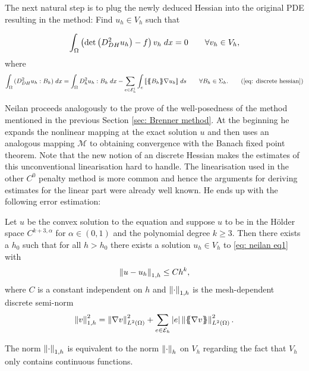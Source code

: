 The next natural step is to plug the newly deduced Hessian into the original \MA PDE resulting in the method: Find $u_h \in V_h$ such that

\begin{align}
		\int_{\Omega} {{ \left(\det{\left(D_{DH}^2 u_h\right)} - f \right) v_h}\;dx} = 0 \qquad \forall v_h \in V_h, \label{eq: neilan eq1}
\end{align}
where
	\begin{align}
		\myIntX  \Omega { (D_{DH}^2 u_h : B_h) }
		= \myIntX  \Omega { D^2_h u_h: B_h}
			 -\sum_{ e \in \edgesi} \myIntS e {  \jump {\average {B_h} \nabla u_h }}\qquad \forall B_h \in \Sigma_h. \tag{\ref{eq: discrete hessian}}
	\end{align}

Neilan proceeds analogously to the prove of the well-posedness of the method mentioned in the previous Section \ref{sec: Brenner method}. At the beginning he expands the nonlinear mapping at the exact solution $u$ and then uses an analogous mapping $\mathcal M$ to obtaining convergence with the Banach fixed point theorem. Note that the new notion of an discrete Hessian makes the estimates of this unconventional linearisation hard to handle. The linearisation used in the other $C^0$ penalty method is more common and hence the arguments for deriving estimates for the linear part were already well known.
He ends up with the following error estimation:
\begin{theorem} \label{thm: error estimate Neilan}
	Let $u$ be the convex solution to the \MA equation and suppose $u$ to be in the Hölder space $C^{k+3,\alpha}$ for $\alpha \in (0,1)$ and the polynomial degree $k\geq3$. Then there exists a $h_0$ such that for all $h > h_0$ there exists a solution $u_h \in V_h$ to \eqref{eq: neilan eq1} with
	\[
		\left\lVert u-u_h \right\rVert_{1,h} \leq C h^k, 
	\]
	where $C$ is a constant independent on $h$ and $\left\lVert \cdot  \right\rVert_{1,h}$ is the mesh-dependent discrete semi-norm 
	\[
		\left\lVert v \right\rVert_{1,h}^2 = \left\lVert \nabla v  \right\rVert^2_{L^2(\Omega)} + \sum_{e \in \mathcal{E}_h} |e| \left\lVert \{\!\!\{ \nabla v \}\!\!\} \right\rVert^2_{L^2(\Omega)}.
	\]
\end{theorem}
The norm $\left\lVert \cdot \right\rVert_{1,h}$ is equivalent to the norm $\left\lVert \cdot \right\rVert_{h}$ on $V_h$ regarding the fact that $V_h$ only contains continuous functions.

